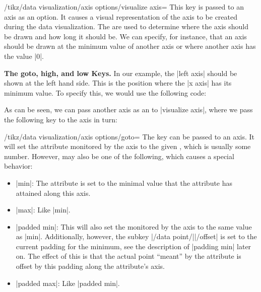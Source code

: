 \begin{key}{/tikz/data visualization/axis options/visualize axis=}
    This key is passed to an axis as an option. It causes a visual
    representation of the axis to be created during the data visualization. The
     are used to determine where the axis should be drawn and how
    long it should be. We can specify, for instance, that an axis should be
    drawn at the minimum value of another axis or where another axis has the
    value |0|.


    \medskip
    \textbf{The goto, high, and low Keys.}
    In our example, the |left axis| should be shown at the left hand side. This
    is the position where the |x axis| has its minimum value. To specify this,
    we would use the following code:
\begin{codeexample}[code only]
left axis={ visualize axis={ x axis={ goto=min } }
\end{codeexample}
    As can be seen, we can pass another axis as an  to
    |visualize axis|, where we pass the following key to the axis in turn:
    \begin{key}{/tikz/data visualization/axis options/goto=}
        The key can be passed to an axis. It will set the attribute monitored
        by the axis to the given , which is usually some number.
        However,  may also be one of the following, which causes a
        special behavior:
        \begin{itemize}
            \item |min|: The attribute is set to the minimal value that the
                attribute has attained along this axis.
            \item |max|: Like |min|.
            \item |padded min|: This will also set the 
                monitored by the axis to the same value as |min|.
                Additionally, however, the subkey
                |/data point/||/offset| is set to the current
                padding for the minimum, see the description of |padding min|
                later on. The effect of this is that the actual point ``meant''
                by the attribute is offset by this padding along the
                attribute's axis.
            \item |padded max|: Like |padded min|.
        \end{itemize}
    \end{key}


\end{key}

